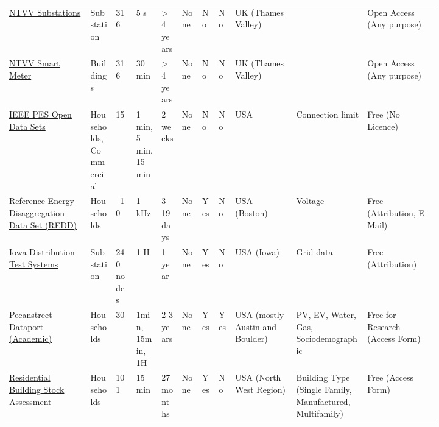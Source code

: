 \begin{sidewaystable*}
{\begin{tabular}{p{0.16\linewidth}p{0.05\linewidth}p{0.04\linewidth}p{0.05\linewidth}p{0.04\linewidth}p{0.04\linewidth}p{0.02\linewidth}p{0.02\linewidth}p{0.12\linewidth}p{0.14\linewidth}p{0.14\linewidth}}
			\href{https://ukerc.rl.ac.uk/DC/cgi-bin/edc_search.pl?GoButton=Detail\&WantComp=146\&\&RELATED=1}{NTVV Substations} & Substation & 316   & 5 s   & > 4 years & None  & No    & No    & UK (Thames Valley) &       & Open Access (Any purpose) \\
			\href{https://ukerc.rl.ac.uk/DC/cgi-bin/edc_search.pl?GoButton=Detail\&WantComp=147\&\&RELATED=1}{NTVV Smart Meter} & Buildings & 316   & 30 min & > 4 years & None  & No    & No    & UK (Thames Valley) &       & Open Access (Any purpose) \\
			
			\href{https://site.ieee.org/pes-iss/data-sets/}{IEEE PES Open Data Sets} 
			& Households, Commercial & 15    & 1 min, 5 min, 15 min & 2 weeks & None  & No    & No    & USA   & Connection limit & Free (No Licence) \\
			\href{http://redd.csail.mit.edu/}{Reference Energy Disaggregation Data Set (REDD)}~\cite{Kolter2011rap} & Households &  ~{}10 & 1 kHz & 3-19 days & None  & Yes   & No    & USA (Boston) & Voltage & Free (Attribution, E-Mail) \\
			\href{http://wzy.ece.iastate.edu/Testsystem.html}{Iowa Distribution Test Systems}~\cite{Bu2019atd} & Substation & 240 nodes & 1 H   & 1 year & None  & Yes   & No    & USA (Iowa) & Grid data & Free (Attribution) \\
			\href{https://www.pecanstreet.org/dataport/}{Pecanstreet Dataport (Academic)}~\cite{Pecan2018d} & Households & 30    & 1min, 15min, 1H & 2-3 years & None  & Yes   & Yes   & USA (mostly Austin and Boulder) & PV, EV, Water, Gas, Sociodemographic & Free for Research (Access Form) \\
			
			\href{https://neea.org/resources/rbsa-ii-combined-database}{Residential Building Stock Assessment}~\cite{Larson2014jua} & Households & 101   & 15 min & 27 months & None  & Yes   & No    & USA (North West Region) & Building Type (Single Family, Manufactured, Multifamily) & Free (Access Form) \\
			

\end{tabular}}
\end{sidewaystable*}
